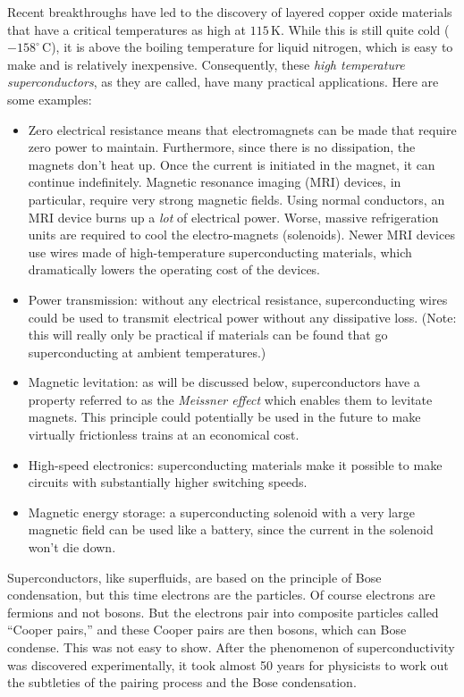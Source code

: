 Recent breakthroughs have led to the discovery of layered copper
oxide materials that have a critical temperatures as high at
$115\,\mbox{K}$.  While this is still quite cold ($-158^\circ\, \mbox{C}$),
it is
above the boiling temperature for liquid nitrogen, which is easy to
make and is relatively inexpensive. Consequently, these {\em high
  temperature superconductors}, as they are called, have many
practical applications.  Here are some examples:
\begin{itemize}
\item Zero electrical resistance means that electromagnets can be made
  that require zero power to maintain.  Furthermore, since there is no
  dissipation, the magnets don't heat up.  Once the current is
  initiated in the magnet, it can continue indefinitely.  Magnetic
  resonance imaging (MRI) devices, in particular, require very strong
  magnetic fields.  Using normal conductors, an MRI device burns up a
  {\em lot} of electrical power.  Worse, massive refrigeration units
  are required to cool the electro-magnets (solenoids).  Newer MRI
  devices use wires made of high-temperature superconducting materials,
  which dramatically lowers the operating cost of the devices.
\item Power transmission: without any electrical resistance,
  superconducting wires could be used to transmit electrical power
  without any dissipative loss.  (Note: this will really only be
  practical if materials can be found that go superconducting at ambient
  temperatures.)
\item Magnetic levitation: as will be discussed below, superconductors
  have a property referred to as the {\em Meissner effect} which
  enables them to levitate magnets.  This principle could potentially
  be used in the future to make virtually frictionless trains at an
  economical cost.
\item High-speed electronics: superconducting materials make it
  possible to make circuits with substantially higher switching
  speeds.
\item Magnetic energy storage: a superconducting solenoid with a very
  large magnetic field can be used like a battery, since the current
  in the solenoid won't die down.
\end{itemize}

Superconductors, like superfluids, are based on the principle of Bose
condensation, but this time electrons are the particles.  Of course
electrons are fermions and not bosons.  But the electrons pair into
composite particles called ``Cooper pairs,'' and these Cooper pairs
are then bosons, which can Bose condense.  This was not easy to show.
After the phenomenon of superconductivity was discovered
experimentally, it took almost 50 years for physicists to work out the
subtleties of the pairing process and the Bose condensation.



